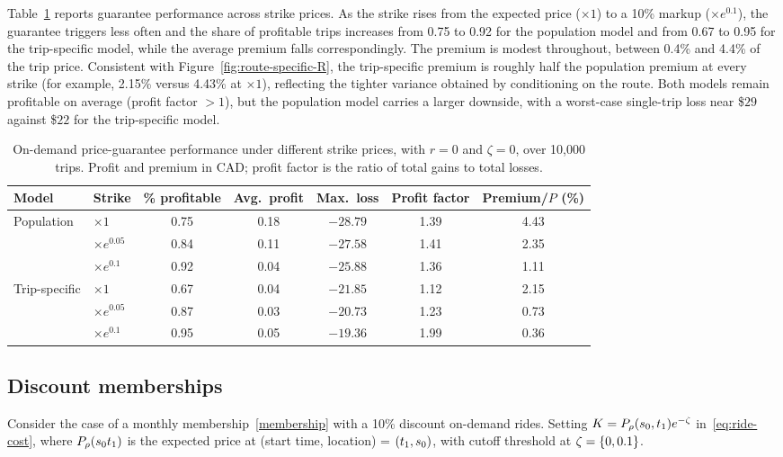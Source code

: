 \documentclass[12pt]{article}
\begin{document}
{{{{{{Table~\ref{tab:strike-metrics} reports guarantee performance across strike prices.
As the strike rises from the expected price ($\times 1$) to a 10\% markup
($\times e^{0.1}$), the guarantee triggers less often and the share of profitable
trips increases from 0.75 to 0.92 for the population model and from 0.67 to 0.95 for
the trip-specific model, while the average premium falls correspondingly. The premium
is modest throughout, between 0.4\% and 4.4\% of the trip price. Consistent with
Figure~\ref{fig:route-specific-R}, the trip-specific premium is roughly half the
population premium at every strike (for example, 2.15\% versus 4.43\% at $\times 1$),
reflecting the tighter variance obtained by conditioning on the route. Both models
remain profitable on average (profit factor $>1$), but the population model carries a
larger downside, with a worst-case single-trip loss near \$$29$ against \$$22$ for the
trip-specific model.
\begin{table}[h!]
    \centering
    \caption{On-demand price-guarantee performance under different strike prices,
    with $r=0$ and $\zeta=0$, over 10{,}000 trips. Profit and premium in CAD;
    profit factor is the ratio of total gains to total losses.}
    \begin{tabular}{l l c c c c c}
    \hline
    Model & Strike & \% profitable & Avg.\ profit & Max.\ loss & Profit factor & Premium/$P$ (\%) \\
    \hline
    Population    & $\times 1$        & 0.75 & 0.18 & $-28.79$ & 1.39 & 4.43 \\
                  & $\times e^{0.05}$ & 0.84 & 0.11 & $-27.58$ & 1.41 & 2.35 \\
                  & $\times e^{0.1}$  & 0.92 & 0.04 & $-25.88$ & 1.36 & 1.11 \\
    Trip-specific & $\times 1$        & 0.67 & 0.04 & $-21.85$ & 1.12 & 2.15 \\
                  & $\times e^{0.05}$ & 0.87 & 0.03 & $-20.73$ & 1.23 & 0.73 \\
                  & $\times e^{0.1}$  & 0.95 & 0.05 & $-19.36$ & 1.99 & 0.36 \\
    \hline
    \end{tabular}
    \label{tab:strike-metrics}
\end{table}

\subsection{Discount memberships}
Consider the case of a monthly membership~\ref{membership} with a 10\% discount on-demand rides. Setting $K = P_\rho({s_0},t_1)e^{-\zeta}$ in~\eqref{eq:ride-cost}, where $P_\rho({s_0} t_1)$ is the expected price at (start time, location) = $(t_1, {s_0})$, with cutoff threshold at $\zeta = \left\{0,0.1\right\}$. 

}}}}}}
\end{document}
